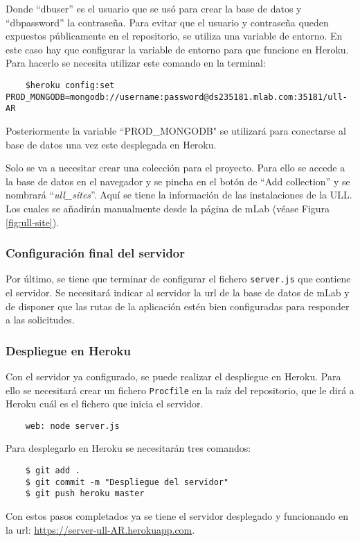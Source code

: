 Donde ``dbuser'' es el usuario que se usó para crear la base de datos y ``dbpassword'' la contraseña. Para evitar que el usuario y contraseña queden expuestos públicamente en el repositorio, se utiliza una variable de entorno. En este caso hay que configurar la variable de entorno para que funcione en Heroku. Para hacerlo se necesita utilizar este comando en la terminal:

\begin{lstlisting}
    $heroku config:set PROD_MONGODB=mongodb://username:password@ds235181.mlab.com:35181/ull-AR
\end{lstlisting}

Posteriormente la variable ``PROD\_MONGODB" se utilizará para conectarse al base de datos una vez este desplegada en Heroku.

Solo se va a necesitar crear una colección para el proyecto. Para ello se accede a la base de datos en el navegador y se pincha en el botón de ``Add collection'' y se nombrará ``\textit{ull\_sites}''. Aquí se tiene la información de las instalaciones de la ULL. Los cuales se añadirán manualmente desde la página de mLab (véase Figura \ref{fig:ull-site}).


\subsubsection{Configuración final del servidor}

Por último, se tiene que terminar de configurar el fichero \texttt{server.js} que contiene el servidor. Se necesitará indicar al servidor la url de la base de datos de mLab y de disponer que las rutas de la aplicación estén bien configuradas para responder a las solicitudes. 


\subsubsection{Despliegue en Heroku}

Con el servidor ya configurado, se puede realizar el despliegue en Heroku. Para ello se necesitará crear un fichero \texttt{Procfile} en la raíz del repositorio, que le dirá a Heroku cuál es el fichero que inicia el servidor.

\begin{lstlisting}
    web: node server.js
\end{lstlisting}

Para desplegarlo en Heroku se necesitarán tres comandos:

\begin{lstlisting}
    $ git add .
    $ git commit -m "Despliegue del servidor"
    $ git push heroku master
\end{lstlisting}

Con estos pasos completados ya se tiene el servidor desplegado y funcionando en la url: \href{https://server-ull-AR.herokuapp.com}{https://server-ull-AR.herokuapp.com}.





